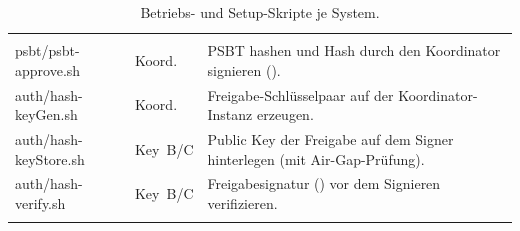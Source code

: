 \begin{xltabular}{\linewidth}{@{} >{\ttfamily\RaggedRight}p{4.2cm} l >{\RaggedRight}X @{}}
\midrule
\addlinespace
{}\\
\addlinespace
psbt\slash psbt-approve.sh   & Koord. & \ac{PSBT} hashen und Hash durch den Koordinator signieren (). \\
auth\slash hash-keyGen.sh    & Koord. & Freigabe-Schlüsselpaar auf der Koordinator-Instanz erzeugen. \\
auth\slash hash-keyStore.sh  & Key~B/C & Public Key der Freigabe auf dem Signer hinterlegen (mit Air-Gap-Prüfung). \\
auth\slash hash-verify.sh    & Key~B/C & Freigabesignatur () vor dem Signieren verifizieren. \\
\caption{Betriebs- und Setup-Skripte je System.} \label{tab:skripte} \\

\end{xltabular}
\endgroup